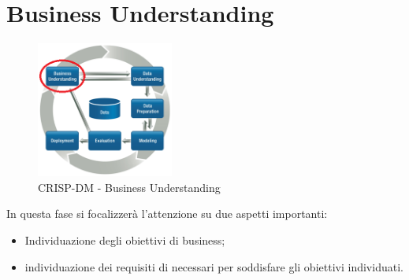 \chapter{Business Understanding}
\begin{figure}[hbtp]
	\centering
	\includegraphics[width=0.4\textwidth]{./images/CRISPDM_1.png}
	\caption{CRISP-DM - Business Understanding}
	\label{CRISPDM_1}
\end{figure}
In questa fase si focalizzerà l'attenzione su due aspetti importanti:
\begin{itemize}
	\item Individuazione degli obiettivi di business;
	\item individuazione dei requisiti di necessari per soddisfare gli obiettivi individuati.
\end{itemize}
